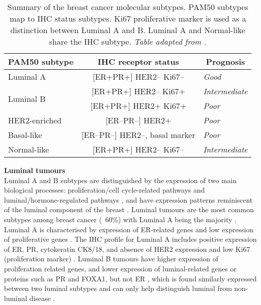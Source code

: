 \begin{table}[!h]
\centering
\caption[Summary of the breast cancer molecular subtypes.]{Summary of the breast cancer molecular subtypes. PAM50 subtypes map to IHC status subtypes. Ki67 proliferative marker is used as a distinction between Luminal A and B. Luminal A and Normal-like share the IHC subtype. \textit{Table adapted from \cite{Dai2015}.}}
\label{table:pam50summary}
\begin{tabular}{l|c|l}
\multicolumn{1}{c|}{\textbf{PAM50  subtype}} & \textbf{IHC receptor status} & \multicolumn{1}{c}{\textbf{Prognosis}} \\ \hline
\multicolumn{1}{|l|}{Luminal A} & {[}ER+PR+{]} HER2-- Ki67-- & \multicolumn{1}{l|}{\textit{Good}} \\ \hline
\multicolumn{1}{|l|}{\multirow{2}{*}{Luminal B}} & {[}ER+PR+{]} HER2-- Ki67+ & \multicolumn{1}{l|}{\textit{Intermediate}} \\ \cline{2-3} 
\multicolumn{1}{|l|}{} & {[}ER+PR+{]} HER2+ Ki67+ & \multicolumn{1}{l|}{\textit{Poor}} \\ \hline
\multicolumn{1}{|l|}{HER2-enriched} & {[}ER--PR--{]} HER2+ & \multicolumn{1}{l|}{\textit{Poor}} \\ \hline
\multicolumn{1}{|l|}{Basal-like} & {[}ER--PR--{]} HER2--, basal marker & \multicolumn{1}{l|}{\textit{Poor}} \\ \hline
\multicolumn{1}{|l|}{Normal-like} & {[}ER+PR+{]} HER2-- Ki67-- & \multicolumn{1}{l|}{\textit{Intermediate}} \\ \hline
\end{tabular}
\end{table}
    

\textbf{Luminal tumours}\\
Luminal A and B subtypes are distinguished by the expression of two main biological processes: proliferation/cell cycle-related pathways and luminal/hormone-regulated pathways \cite{Vidal2017}, and have expression patterns reminiscent of the luminal component of the breast \cite{perou2000molecular}. Luminal tumours are the most common subtypes among breast cancer (~60\%) with Luminal A being the majority \cite{Dai2015}.  Luminal A is characterised by expression of ER-related genes and low expression of proliferative genes \cite{eroles2012molecular}. The IHC profile for Luminal A includes positive expression of ER, PR, cytokeratin CK8/18, and absence of HER2 expression and low Ki67 (proliferation marker) \cite{Vidal2017}. Luminal B tumours have higher expression of proliferation related genes, and lower expression of luminal-related genes or proteins such as PR and FOXA1, but not ER \cite{prat2012prognostic}, which is found similarly expressed between two luminal subtypes and can only help distinguish luminal from non-luminal disease \cite{Vidal2017}.

